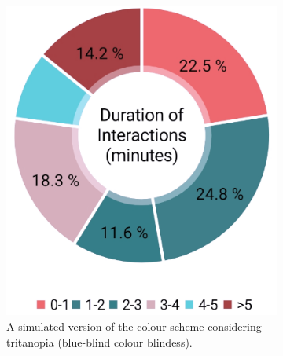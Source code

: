 \documentclass{l4proj}
\begin{document}
\begin{figure}[!htb]
    \centering
    \begin{subfigure}[b]{0.3\textwidth}
        \includegraphics[width=\textwidth]{images/tritanopia.png}
        \caption{ A simulated version of the colour scheme considering tritanopia (blue-blind colour blindess). }
        \label{fig:tritanopia}
    \end{subfigure}
    ~
    \begin{subfigure}[b]{0.3\textwidth}

\end{subfigure}
\end{figure}
\end{document}
